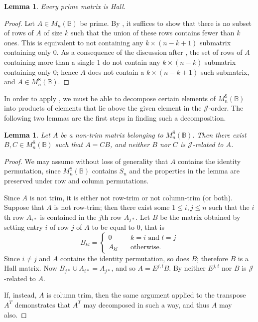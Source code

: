 \documentclass[11pt]{article}
\newtheorem{lemma}[thm]{Lemma}
\numberwithin{equation}{section}
\newcommand{\B}{\mathbb{B}}
\newcommand{\Bn}{M_n(\B)}
\newcommand{\Halln}{M_n^{\text{S}}(\B)}
\newcommand{\J}{\mathscr{J}}
\begin{document}
\begin{lemma}
Every prime matrix is Hall.
\end{lemma}
\begin{proof}
  Let $A \in \Bn$ be prime. By , it suffices to show
  that there is no subset of rows of $A$ of size $k$ such that the union of
  these rows contains fewer than $k$ ones. This is equivalent to not containing
  any $k \times (n - k + 1)$ submatrix containing only $0$. As a consequence of
  the discussion after \cite[Definition 2.4]{Caen1981aa}, the set of rows of $A$
  containing more than a single $1$ do not contain any $k \times (n - k)$
  submatrix containing only $0$; hence $A$ does not contain a $k \times (n - k +
  1)$ such submatrix, and $A \in \Halln$.
\end{proof}

In order to apply , we must be able to decompose
certain elements of $\Halln$ into products of elements that lie above the given
element in the $\J$-order. The following two lemmas are the first steps in
finding such a decomposition.

\begin{lemma}
  Let $A$ be a non-trim matrix belonging to $\Halln$. Then there exist $B, C \in
  \Halln$ such that $A = CB$, and neither $B$ nor $C$ is $\J$-related to $A$.
\end{lemma}
\begin{proof}
  We may assume without loss of generality that $A$ contains the identity
  permutation, since $\Halln$ contains $S_n$ and the properties in the lemma are
  preserved under row and column permutations.

  Since $A$ is not trim, it is either not row-trim or not column-trim (or both).
  Suppose that $A$ is not row-trim; then there exist some $1 \leq i, j
  \leq n$ such that the $i$th row $A_{i*}$ is contained in the $j$th row
  $A_{j*}$.
  Let $B$ be the matrix obtained by setting entry $i$ of row $j$ of $A$ to be
  equal to $0$, that is
  \[B_{kl} = \begin{cases} 
                0 \quad& k = i \text{ and } l = j \\ 
                A_{kl} \quad& \text{otherwise.} 
              \end{cases} \]
  Since $i \neq j$ and $A$ contains the identity permutation, so does $B$;
  therefore $B$ is a Hall matrix. Now $B_{j*} \cup A_{i*} = A_{j*}$, and so $A =
  E^{j,i}B$. By  neither $E^{j,i}$ nor $B$ is
  $\J$-related to $A$.
  
  If, instead, $A$ is column trim, then the same argument applied to the
  transpose $A^T$ demonstrates that $A^T$ may decomposed in such a way, and thus
  $A$ may also.
\end{proof}
\end{document}
